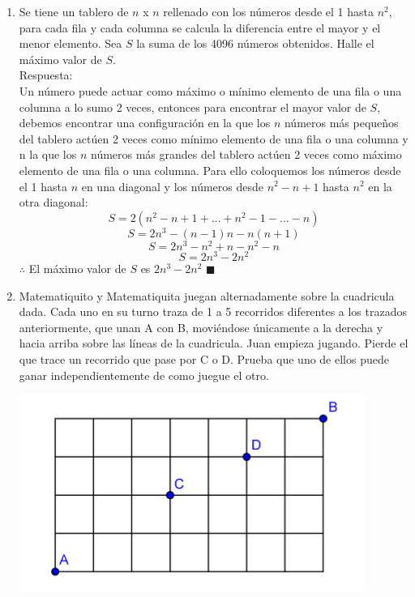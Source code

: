 \documentclass{book}
\begin{document}
\begin{enumerate}
        \item Se tiene un tablero de $n$ x $n$ rellenado con los números desde el 1 hasta $n^2$, para cada fila y cada columna se calcula la diferencia entre el mayor y el menor elemento. Sea $S$ la suma de los 4096 números obtenidos. Halle el máximo valor de $S$.\\
        Respuesta:\\
        Un número puede actuar como máximo o mínimo elemento de una fila o una columna a lo sumo 2 veces, entonces para encontrar el mayor valor de $S$, debemos encontrar una configuración en la que los $n$ números más pequeños del tablero actúen 2 veces como mínimo elemento de una fila o una columna y n la que los $n$ números más grandes del tablero actúen 2 veces como máximo elemento de una fila o una columna. Para ello coloquemos los números desde el 1 hasta $n$ en una diagonal y los números desde $n^2-n+1$ hasta $n^2$ en la otra diagonal:
        $$S=2(n^2-n+1+\ldots +n^2-1-\ldots-n)$$
        $$S=2n^3-(n-1)n-n(n+1)$$
        $$S=2n^3-n^2+n-n^2-n$$
        $$S=2n^3-2n^2$$
        $\therefore$ El máximo valor de $S$ es $2n^3-2n^2$ $\blacksquare$\\
        \item Matematiquito y Matematiquita juegan alternadamente sobre la cuadricula dada. Cada uno en su turno traza de 1 a 5 recorridos diferentes a los trazados anteriormente, que unan A con B, moviéndose únicamente a la derecha y hacia arriba sobre las líneas de la cuadricula. Juan empieza jugando. Pierde el que trace un recorrido que pase por C o D. Prueba que uno de ellos puede ganar independientemente de como juegue el otro.
        \begin{center}
            \includegraphics[scale=1]{imagenes/Combinatoria/13.png}
        \end{center}


\end{enumerate}
\end{document}
